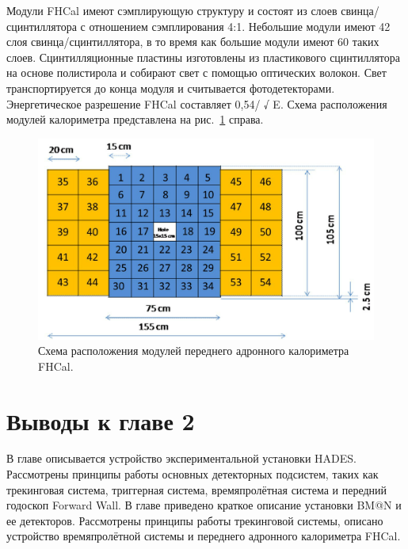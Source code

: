 Модули FHCal имеют сэмплирующую структуру и состоят из слоев свинца/сцинтиллятора с отношением сэмплирования 4:1. 
Небольшие модули имеют 42 слоя свинца/сцинтиллятора, в то время как большие модули имеют 60 таких слоев. 
Сцинтилляционные пластины изготовлены из пластикового сцинтиллятора на основе полистирола и собирают свет с помощью оптических волокон. 
Свет транспортируется до конца модуля и считывается фотодетекторами.
Энергетическое разрешение FHCal составляет 0,54/ √ E.
Схема расположения модулей калориметра представлена на рис.~\ref{fig:fhcal_layout} справа.
%
\begin{figure}[ht]
\begin{center}
\includegraphics[width=0.55\linewidth]{images/FHCal_modules.png}
\caption{Схема расположения модулей переднего адронного калориметра FHCal.}
\label{fig:fhcal_layout}
\end{center}
\end{figure}

\section{Выводы к главе 2}

В главе описывается устройство экспериментальной установки HADES. 
Рассмотрены принципы работы основных детекторных подсистем, таких как трекинговая система, триггерная система, времяпролётная система и передний годоскоп Forward Wall.
В главе приведено краткое описание установки BM@N и ее детекторов.
Рассмотрены принципы работы трекинговой системы, описано устройство времяпролётной системы и переднего адронного калориметра FHCal.
